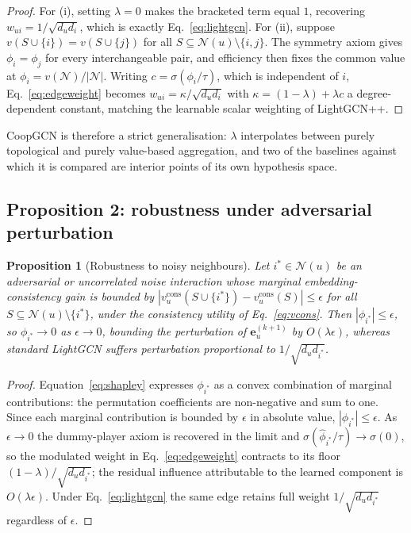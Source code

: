 \documentclass[final,5p,times,twocolumn]{elsarticle}
\newtheorem{proposition}{Proposition}
\begin{document}
\begin{proof}
For (i), setting $\lambda = 0$ makes the bracketed term equal $1$, recovering
$w_{ui} = 1/\sqrt{d_u d_i}$, which is exactly Eq.~\eqref{eq:lightgcn}. For
(ii), suppose $v(S \cup \{i\}) = v(S \cup \{j\})$ for all $S \subseteq
\mathcal{N}(u) \setminus \{i,j\}$. The symmetry axiom gives $\phi_i = \phi_j$
for every interchangeable pair, and efficiency then fixes the common value at
$\phi_i = v(\mathcal{N})/|\mathcal{N}|$. Writing $c = \sigma(\phi_i/\tau)$,
which is independent of $i$, Eq.~\eqref{eq:edgeweight} becomes $w_{ui} =
\kappa/\sqrt{d_u d_i}$ with $\kappa = (1-\lambda) + \lambda c$ a
degree-dependent constant, matching the learnable scalar weighting of
LightGCN++.
\end{proof}

CoopGCN is therefore a strict generalisation: $\lambda$ interpolates between
purely topological and purely value-based aggregation, and two of the
baselines against which it is compared are interior points of its own
hypothesis space.

\subsection{Proposition 2: robustness under adversarial perturbation}
\label{sec:prop2}

\begin{proposition}[Robustness to noisy neighbours]
\label{prop:robust}
Let $i^\ast \in \mathcal{N}(u)$ be an adversarial or uncorrelated noise
interaction whose marginal embedding-consistency gain is bounded by
$|v_u^{\mathrm{cons}}(S \cup \{i^\ast\}) - v_u^{\mathrm{cons}}(S)| \le
\epsilon$ for all $S \subseteq \mathcal{N}(u) \setminus \{i^\ast\}$, under the
consistency utility of Eq.~\eqref{eq:vcons}. Then $|\phi_{i^\ast}| \le
\epsilon$, so $\phi_{i^\ast} \to 0$ as $\epsilon \to 0$, bounding the
perturbation of $\mathbf{e}_u^{(k+1)}$ by $O(\lambda \epsilon)$, whereas
standard LightGCN suffers perturbation proportional to
$1/\sqrt{d_u d_{i^\ast}}$.
\end{proposition}

\begin{proof}
Equation~\eqref{eq:shapley} expresses $\phi_{i^\ast}$ as a convex combination
of marginal contributions: the permutation coefficients are non-negative and
sum to one. Since each marginal contribution is bounded by $\epsilon$ in
absolute value, $|\phi_{i^\ast}| \le \epsilon$. As $\epsilon \to 0$ the
dummy-player axiom is recovered in the limit and
$\sigma(\hat{\phi}_{i^\ast}/\tau) \to \sigma(0)$, so the modulated weight in
Eq.~\eqref{eq:edgeweight} contracts to its floor
$(1-\lambda)/\sqrt{d_u d_{i^\ast}}$; the residual influence attributable to
the learned component is $O(\lambda\epsilon)$. Under
Eq.~\eqref{eq:lightgcn} the same edge retains full weight
$1/\sqrt{d_u d_{i^\ast}}$ regardless of $\epsilon$.
\end{proof}
\end{document}
